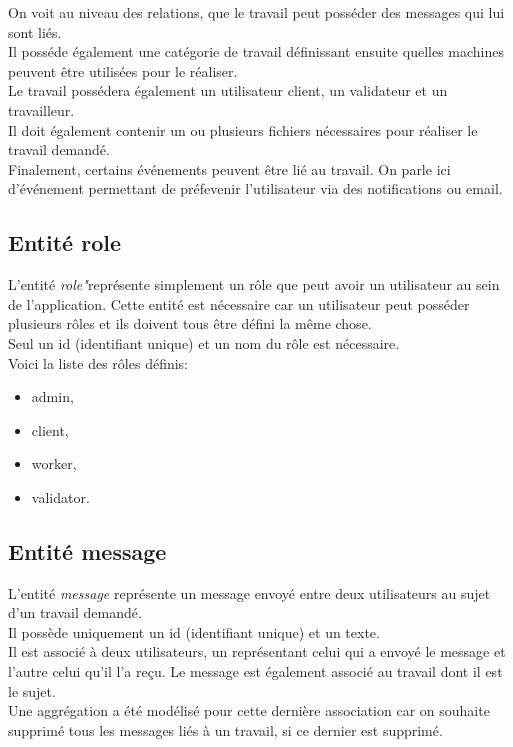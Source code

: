 \documentclass[
    iai, %
    il, %
]{heig-tb}
\begin{document}
On voit au niveau des relations, que le travail peut posséder des messages qui lui sont liés.\\
Il posséde également une catégorie de travail définissant ensuite quelles machines peuvent être utilisées pour le réaliser.\\
Le travail possédera également un utilisateur client, un validateur et un travailleur.\\
Il doit également contenir un ou plusieurs fichiers nécessaires pour réaliser le travail demandé.\\
Finalement, certains événements peuvent être lié au travail. On parle ici d'événement permettant de préfevenir l'utilisateur via des notifications ou email.

\subsection{Entité role}
L'entité \emph{role"}représente simplement un rôle que peut avoir un utilisateur au sein de l'application. Cette entité est nécessaire car un utilisateur peut posséder plusieurs rôles et ils doivent tous être défini la même chose.\\
Seul un id (identifiant unique) et un nom du rôle est nécessaire.\\
Voici la liste des rôles définis:
\begin{itemize}
    \item admin,
    \item client,
    \item worker,
    \item validator.
\end{itemize}

\subsection{Entité message}
L'entité \emph{message} représente un message envoyé entre deux utilisateurs au sujet d'un travail demandé.\\
Il possède uniquement un id (identifiant unique) et un texte.\\
Il est associé à deux utilisateurs, un représentant celui qui a envoyé le message et l'autre celui qu'il l'a reçu. Le message est également associé au travail dont il est le sujet.\\
Une aggrégation a été modélisé pour cette dernière association car on souhaite supprimé tous les messages liés à un travail, si ce dernier est supprimé.
\end{document}
